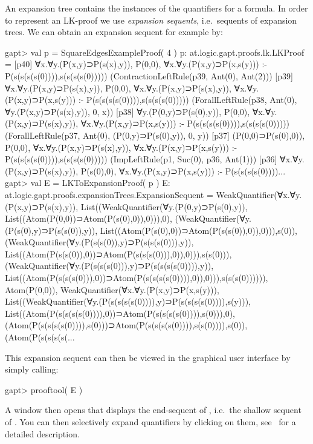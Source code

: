 \documentclass[a4paper,11pt]{article}
\newcommand{\cli}[1]{{\ttfamily {#1}}}
\begin{document}
An expansion tree contains the instances of the quantifiers for a formula. In order
to represent an LK-proof we use {\em expansion sequents}, i.e.~sequents of expansion trees.
We can obtain an expansion sequent for example by:
\begin{clilisting}
gapt> val p = SquareEdgesExampleProof( 4 )
p: at.logic.gapt.proofs.lk.LKProof =
[p40] ∀x.∀y.(P(x,y)⊃P(s(x),y)), P(0,0), ∀x.∀y.(P(x,y)⊃P(x,s(y))) :- P(s(s(s(s(0)))),s(s(s(s(0)))))    (ContractionLeftRule(p39, Ant(0), Ant(2)))
[p39] ∀x.∀y.(P(x,y)⊃P(s(x),y)), P(0,0), ∀x.∀y.(P(x,y)⊃P(s(x),y)), ∀x.∀y.(P(x,y)⊃P(x,s(y))) :- P(s(s(s(s(0)))),s(s(s(s(0)))))    (ForallLeftRule(p38, Ant(0), ∀y.(P(x,y)⊃P(s(x),y)), 0, x))
[p38] ∀y.(P(0,y)⊃P(s(0),y)), P(0,0), ∀x.∀y.(P(x,y)⊃P(s(x),y)), ∀x.∀y.(P(x,y)⊃P(x,s(y))) :- P(s(s(s(s(0)))),s(s(s(s(0)))))    (ForallLeftRule(p37, Ant(0), (P(0,y)⊃P(s(0),y)), 0, y))
[p37] (P(0,0)⊃P(s(0),0)), P(0,0), ∀x.∀y.(P(x,y)⊃P(s(x),y)), ∀x.∀y.(P(x,y)⊃P(x,s(y))) :- P(s(s(s(s(0)))),s(s(s(s(0)))))    (ImpLeftRule(p1, Suc(0), p36, Ant(1)))
[p36] ∀x.∀y.(P(x,y)⊃P(s(x),y)), P(s(0),0), ∀x.∀y.(P(x,y)⊃P(x,s(y))) :- P(s(s(s(s(0))))...
gapt> val E = LKToExpansionProof( p )
E: at.logic.gapt.proofs.expansionTrees.ExpansionSequent = WeakQuantifier(∀x.∀y.(P(x,y)⊃P(s(x),y)), List((WeakQuantifier(∀y.(P(0,y)⊃P(s(0),y)), List((Atom(P(0,0))⊃Atom(P(s(0),0)),0))),0), (WeakQuantifier(∀y.(P(s(0),y)⊃P(s(s(0)),y)), List((Atom(P(s(0),0))⊃Atom(P(s(s(0)),0)),0))),s(0)), (WeakQuantifier(∀y.(P(s(s(0)),y)⊃P(s(s(s(0))),y)), List((Atom(P(s(s(0)),0))⊃Atom(P(s(s(s(0))),0)),0))),s(s(0))), (WeakQuantifier(∀y.(P(s(s(s(0))),y)⊃P(s(s(s(s(0)))),y)), List((Atom(P(s(s(s(0))),0))⊃Atom(P(s(s(s(s(0)))),0)),0))),s(s(s(0)))))), Atom(P(0,0)), WeakQuantifier(∀x.∀y.(P(x,y)⊃P(x,s(y))), List((WeakQuantifier(∀y.(P(s(s(s(s(0)))),y)⊃P(s(s(s(s(0)))),s(y))), List((Atom(P(s(s(s(s(0)))),0))⊃Atom(P(s(s(s(s(0)))),s(0))),0), (Atom(P(s(s(s(s(0)))),s(0)))⊃Atom(P(s(s(s(s(0)))),s(s(0)))),s(0)), (Atom(P(s(s(s(s(...
\end{clilisting}
This expansion sequent can then be viewed in the graphical user interface by simply calling:
\begin{clilisting}
gapt> prooftool( E )

\end{clilisting}

A window then opens that displays the end-sequent of \cli{p}, i.e.\ the shallow
sequent of \cli{E}.  You can then selectively expand quantifiers by clicking on
them, see~\cite{Hetzl13Understanding} for a detailed description.
\end{document}
